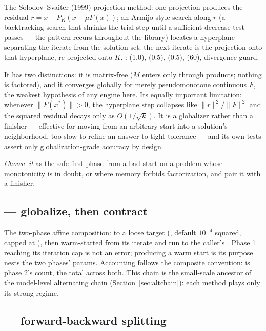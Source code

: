 The Solodov--Svaiter (1999) projection method: one projection produces the
residual $r = x - P_K(x - \mu F(x))$; an Armijo-style search along $r$ (a
backtracking search that shrinks the trial step until a sufficient-decrease
test passes --- the pattern recurs throughout the library) locates a
hyperplane separating the iterate from the solution set; the next iterate
is the projection onto that hyperplane, re-projected onto $K$.
:  (1.0),  (0.5),
 (0.5),  (60), divergence guard.

It has two distinctions: it is matrix-free ($M$ enters only through
products; nothing is factored), and it converges globally for merely
pseudomonotone continuous $F$, the weakest hypothesis of any engine here.
Its equally important limitation: whenever $\|F(x^\ast)\| > 0$,
the hyperplane step collapses like $\|r\|^2/\|F\|^2$ and the squared
residual decays only as $O(1/\sqrt{k})$. It is a globalizer rather than a
finisher --- effective for moving from an arbitrary start into a solution's
neighborhood, too slow to refine an answer to tight tolerance --- and its
own tests assert only globalization-grade accuracy by design.

\emph{Choose it} as the safe first phase from a bad start on a problem whose
monotonicity is in doubt, or where memory forbids factorization, and pair
it with a finisher.

\subsection{ --- globalize, then contract}
\label{sec:chained}

The two-phase affine composition:  to a loose target
(, default $10^{-4}$ squared, capped at
), then  warm-started from its iterate and
run to the caller's . Phase 1 reaching its iteration cap is
not an error; producing a warm start is its purpose.
 nests the two phases' params. Accounting follows
the composite convention:  is phase 2's count, 
the total across both. This chain is the small-scale ancestor of the
model-level alternating chain (Section~\ref{sec:altchain}): each method
plays only its strong regime.

\subsection{ --- forward-backward splitting}
\label{sec:fbs}

